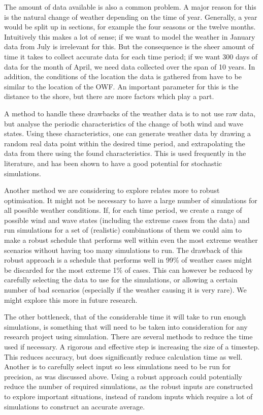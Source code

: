 \documentclass[a4paper,12pt]{article}
\begin{document}
The amount of data available is also a common problem. A major reason for this is the natural change of weather depending on the time of year. Generally, a year would be split up in sections, for example the four seasons or the twelve months. Intuitively this makes a lot of sense; if we want to model the weather in January data from July is irrelevant for this. But the consequence is the sheer amount of time it takes to collect accurate data for each time period; if we want 300 days of data for the month of April, we need data collected over the span of 10 years. In addition, the conditions of the location the data is gathered from have to be similar to the location of the OWF. An important parameter for this is the distance to the shore, but there are more factors which play a part. 

A method to handle these drawbacks of the weather data is to not use raw data, but analyse the periodic characteristics of the change of both wind and wave states. Using these characteristics, one can generate weather data by drawing a random real data point within the desired time period, and extrapolating the data from there using the found characteristics. This is used frequently in the literature, and has been shown to have a good potential for stochastic simulations. 

Another method we are considering to explore relates more to robust optimisation. It might not be necessary to have a large number of simulations for all possible weather conditions. If, for each time period, we create a range of possible wind and wave states (including the extreme cases from the data) and run simulations for a set of (realistic) combinations of them we could aim to make a robust schedule that performs well within even the most extreme weather scenarios without having too many simulations to run. The drawback of this robust approach is a schedule that performs well in 99\% of weather cases might be discarded for the most extreme 1\% of cases. This can however be reduced by carefully selecting the data to use for the simulations, or allowing a certain number of bad scenarios (especially if the weather causing it is very rare). We might explore this more in future research. 


\bigskip

The other bottleneck, that of the considerable time it will take to run enough simulations, is something that will need to be taken into consideration for any research project using simulation. There are several methods to reduce the time used if necessary. A rigorous and effective step is increasing the size of a timestep. This reduces accuracy, but does significantly reduce calculation time as well. Another is to carefully select input so less simulations need to be run for precision, as was discussed above. Using a robust approach could potentially reduce the number of required simulations, as the robust inputs are constructed to explore important situations, instead of random inputs which require a lot of simulations to construct an accurate average. 
\end{document}
